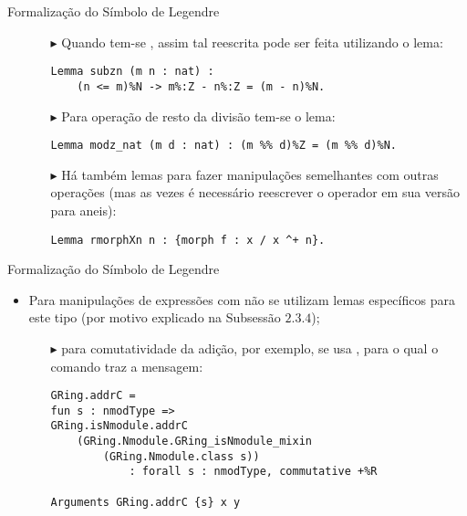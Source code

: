 \begin{frame}[fragile]{Formalização do Símbolo de Legendre}
    \begin{itemize}
        \item[]
        \begin{itemize}
            \item[$\blacktriangleright$] Quando  tem-se , assim tal reescrita pode ser feita utilizando o lema:
                \begin{lstlisting}[language=coq,frame=single,tabsize=1]
 Lemma subzn (m n : nat) : 
    (n <= m)%N -> m%:Z - n%:Z = (m - n)%N. 
                \end{lstlisting}

            \item[$\blacktriangleright$] Para operação de resto da divisão tem-se o lema:
                \begin{lstlisting}[language=coq,frame=single,tabsize=1]
Lemma modz_nat (m d : nat) : (m %% d)%Z = (m %% d)%N.
                \end{lstlisting}
            \item[$\blacktriangleright$] Há também lemas para fazer manipulações semelhantes com outras operações (mas as vezes é necessário reescrever o operador em sua versão para aneis):
                \begin{lstlisting}[language=coq,frame=single,tabsize=1]
Lemma rmorphXn n : {morph f : x / x ^+ n}.
                \end{lstlisting}
        \end{itemize}
    \end{itemize}
\end{frame}

\begin{frame}[fragile]{Formalização do Símbolo de Legendre}
    \begin{itemize}
        \item Para manipulações de expressões com  não se utilizam lemas específicos para este tipo (por motivo explicado na Subsessão $2.3.4$);
            \begin{itemize}
                \item[$\blacktriangleright$] para comutatividade da adição, por exemplo, se usa , para o qual o comando  traz a mensagem:
                    \begin{lstlisting}[language=coq-error,frame=single,tabsize=1]
GRing.addrC =
fun s : nmodType =>
GRing.isNmodule.addrC
    (GRing.Nmodule.GRing_isNmodule_mixin 
        (GRing.Nmodule.class s))
            : forall s : nmodType, commutative +%R

Arguments GRing.addrC {s} x y
                    \end{lstlisting}
            \end{itemize}
    \end{itemize}
\end{frame}